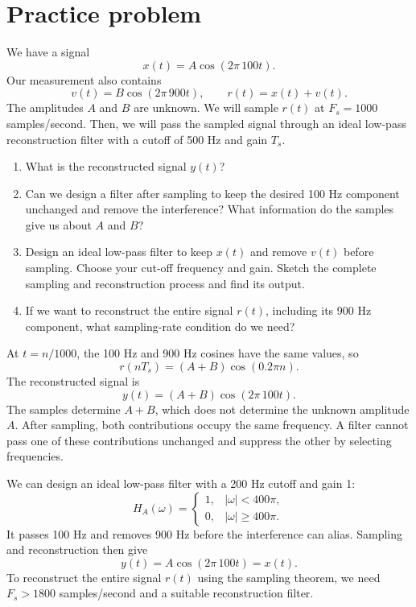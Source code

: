 \clearpage
\section{Practice problem}
\begin{popquiz}
We have a signal
\[
x(t)=A\cos(2\pi\,100t).
\]
Our measurement also contains
\[
v(t)=B\cos(2\pi\,900t),\qquad r(t)=x(t)+v(t).
\]
The amplitudes $A$ and $B$ are unknown. We will sample $r(t)$ at
$F_s=1000$ samples/second. Then, we will pass the sampled signal through
an ideal low-pass reconstruction filter with a cutoff of 500 Hz and
gain $T_s$.
\begin{enumerate}[label=(\alph*)]
    \item What is the reconstructed signal $y(t)$?
    \item Can we design a filter after sampling to keep the desired
    100 Hz component unchanged and remove the interference? What
    information do the samples give us about $A$ and $B$?
    \item Design an ideal low-pass filter to keep $x(t)$ and remove
    $v(t)$ before sampling. Choose your cut-off frequency and gain.
    Sketch the complete sampling and reconstruction process and find
    its output.
    \item If we want to reconstruct the entire signal $r(t)$,
    including its 900 Hz component, what sampling-rate condition do
    we need?
\end{enumerate}
\popqsplit
At $t=n/1000$, the 100 Hz and 900 Hz cosines have the same values, so
\[
r(nT_s)=(A+B)\cos(0.2\pi n).
\]
The reconstructed signal is
\[
y(t)=(A+B)\cos(2\pi\,100t).
\]
The samples determine $A+B$, which does not determine the unknown amplitude
$A$. After sampling, both contributions occupy the same frequency.
A filter cannot pass one of these contributions unchanged and suppress
the other by selecting frequencies.

We can design an ideal low-pass filter with a 200 Hz cutoff and gain 1:
\[
H_A(\omega)=
\begin{cases}
1,& |\omega|<400\pi,\\
0,& |\omega|\geq400\pi.
\end{cases}
\]
It passes 100 Hz and removes 900 Hz before the interference can alias.
Sampling and reconstruction then give
\[
y(t)=A\cos(2\pi\,100t)=x(t).
\]
To reconstruct the entire signal $r(t)$ using the sampling theorem,
we need $F_s>1800$ samples/second and a suitable reconstruction filter.
\end{popquiz}

